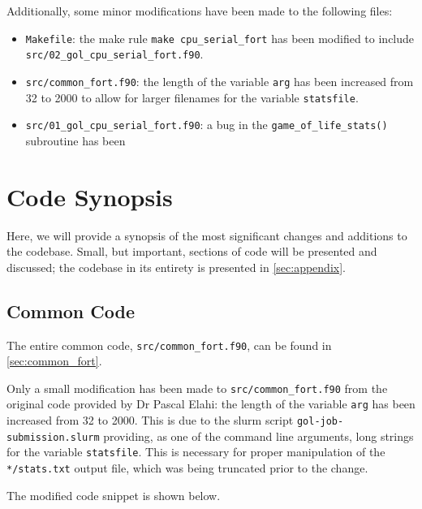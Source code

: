 \documentclass[]{article}
\begin{document}
Additionally, some minor modifications have been made to the following files:

\begin{itemize}
\item \lstinline[style=ff]{Makefile}: the make rule
  \lstinline[style=ff]{make cpu_serial_fort} has been modified to include \\
  \lstinline[style=ff]{src/02_gol_cpu_serial_fort.f90}.

\item \lstinline[style=ff]{src/common_fort.f90}: the length of the variable
  \lstinline{arg} has been increased from 32 to 2000 to allow for larger
  filenames for the variable \lstinline{statsfile}.

\item \lstinline[style=ff]{src/01_gol_cpu_serial_fort.f90}: a bug in the
  \lstinline{game_of_life_stats()} subroutine has been
\end{itemize}

\newpage
\section{Code Synopsis}
\label{sec:code-synopsis}

Here, we will provide a synopsis of the most significant changes and additions
to the codebase.
Small, but important, sections of code will be presented and discussed; the
codebase in its entirety is presented in \autoref{sec:appendix}.

\subsection{Common Code}
\label{sec:common-code}

The entire common code, \lstinline[style=ff]{src/common_fort.f90}, can be found
in \autoref{sec:common_fort}.

Only a small modification has been made to
\lstinline[style=ff]{src/common_fort.f90} from the original code provided by Dr
Pascal Elahi: the length of the variable \lstinline{arg} has been increased from
32 to 2000.
This is due to the slurm script \lstinline[style=ff]{gol-job-submission.slurm}
providing, as one of the command line arguments, long strings for the variable
\lstinline{statsfile}.
This is necessary for proper manipulation of the
\lstinline[style=ff]{*/stats.txt} output file, which was being truncated prior
to the change.

The modified code snippet is shown below.
\end{document}

